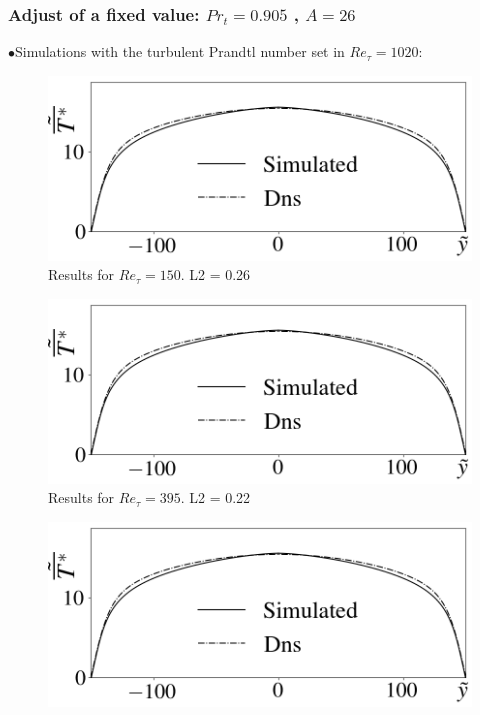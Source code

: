 \documentclass[xcolor=dvipsnames,8pt,aspectratio=34]{beamer}
\begin{document}
		\begin{frame}
		\frametitle{Adjust of a fixed value: $Pr_t = 0.905$ , $A = 26$}
		$\bullet$Simulations with the turbulent Prandtl number set in $Re_\tau = 1020$:  \\
		\begin{minipage}[h!]{0.45\textwidth}
			 \begin{figure}
			 	\centering
			 	\includegraphics[angle=0, scale=0.18]{fotos_formatacao_final/Temperature_150_071_Prt0905_A26}
			 	\caption{Results for $Re_\tau = 150$. L2 = 0.26}
			 \end{figure}
			 \begin{figure}
			 	\centering
			 	\includegraphics[angle=0, scale=0.18]{fotos_formatacao_final/Temperature_150_071_Prt0905_A26}
			 	\caption{Results for $Re_\tau = 395$. L2 = 0.22}
			 \end{figure}
		\end{minipage}\hfill
		\begin{minipage}[h!]{0.45\textwidth}
			\begin{figure}
				\centering
				\includegraphics[angle=0, scale=0.18]{fotos_formatacao_final/Temperature_150_071_Prt0905_A26}

\end{figure}
\end{minipage}
\end{frame}
\end{document}
